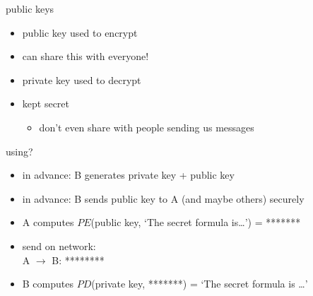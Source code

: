 \begin{frame}{public keys}
    \begin{itemize}
    \item public key used to encrypt
    \item can share this with everyone!
    \vspace{.5cm}
    \item private key used to decrypt
    \item kept secret
        \begin{itemize}
        \item don't even share with people sending us messages
        \end{itemize}
    \end{itemize}
\end{frame}

\begin{frame}{using?}
    \begin{itemize}
    \item in advance: B generates private key + public key
    \item in advance: B sends public key to A (and maybe others) securely
    \vspace{.5cm}
    \item A computes $PE$(public key, `The secret formula is\ldots') = *******
    \item send on network: \\
    A $\rightarrow$ B: ********
    \item B computes $PD$(private key, *******) = `The secret formula is \ldots'
    \end{itemize}
\end{frame}
